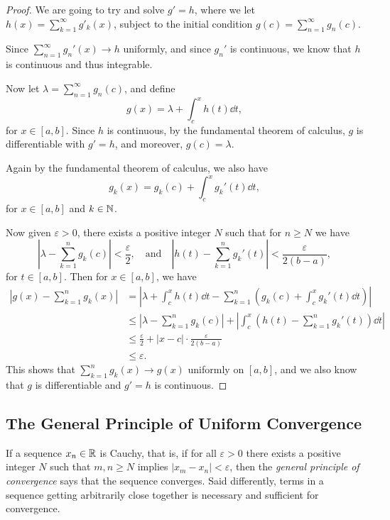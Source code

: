\documentclass[a4paper]{scrartcl}
\begin{document}
\begin{proof}
    We are going to try and solve $g' = h$, where we let $h(x) = \sum_{k = 1}^{\infty} g'_k(x)$, subject to the initial condition $g(c) = \sum_{n = 1}^{\infty} g_n(c)$.

    Since $\sum_{n = 1}^{\infty} g_n'(x)\rightarrow h$ uniformly, and since $g_n'$ is continuous, we know that $h$ is continuous and thus integrable. 

    Now let $\lambda = \sum_{n = 1}^{\infty} g_n(c)$, and define
    $$
    g(x) = \lambda + \int_c^x h(t) \dd t,
    $$
    for $x \in [a, b]$. Since $h$ is continuous, by the fundamental theorem of calculus, $g$ is differentiable with $g' = h$, and moreover, $g(c) = \lambda$.

    Again by the fundamental theorem of calculus, we also have
    $$
    g_k(x) = g_k(c) + \int_c^x g_k'(t) \dd t,
    $$
    for $x \in [a, b]$ and $k \in \mathbb{N}$. 

    Now given $\varepsilon > 0$, there exists a positive integer $N$ such that for $n \geq N$ we have
    $$
    \left|\lambda - \sum_{k = 1}^n g_k(c)\right| < \frac{\varepsilon}{2}, \quad \text{and} \quad \left|h(t) - \sum_{k = 1}^n g_k'(t)\right| < \frac{\varepsilon}{2(b - a)},
    $$
    for $t \in [a, b]$. Then for $x \in [a, b]$, we have
    \begin{align*}
        \left|g(x) - \sum_{k = 1}^n g_k(x)\right| &= 
        \left|\lambda + \int_c^x h(t)\dd t - \sum_{k = 1}^n \left(g_k(c) + \int_c^x g_k'(t) \dd t \right)\right|
        \\
        & \leq \left|\lambda - \sum_{k = 1}^n g_k(c)\right| + \left|\int_c^x \left(h(t) - \sum_{k = 1}^n g_k'(t) \right) \dd t\right| \\
        &\leq \frac{\varepsilon}{2} + |x - c| \cdot \frac{\varepsilon}{2(b - a)} \\&\leq \varepsilon.
    \end{align*}
    This shows that $\sum_{k = 1}^n g_k(x) \rightarrow g(x)$ uniformly on $[a, b]$, and we also know that $g$ is differentiable and $g' = h$ is continuous.
\end{proof}

\subsection{The General Principle of Uniform Convergence}

If a sequence $x_n \in \mathbb{R}$ is Cauchy, that is, if for all $\varepsilon > 0$ there exists a positive integer $N$ such that $m, n \geq N$ implies $|x_m - x_n| < \varepsilon$, then the \emph{general principle of convergence} says that the sequence converges.
Said differently, terms in a sequence getting arbitrarily close together is necessary and sufficient for convergence. 
\end{document}
